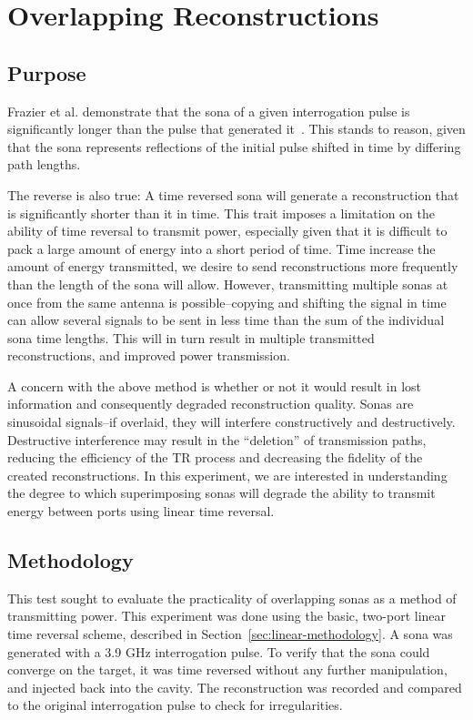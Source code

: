 \chapter{Overlapping Reconstructions}
\label{ch:overlapping}

\section{Purpose}
\label{sec:overlapping-purpose}

Frazier et al. demonstrate that the sona of a given interrogation pulse is significantly longer than the pulse that generated it~\cite{nltr-wave-chaotic}. This stands to reason, given that the sona represents reflections of the initial pulse shifted in time by differing path lengths.

The reverse is also true: A time reversed sona will generate a reconstruction that is significantly shorter than it in time. This trait imposes a limitation on the ability of time reversal to transmit power, especially given that it is difficult to pack a large amount of energy into a short period of time. Time increase the amount of energy transmitted, we desire to send reconstructions more frequently than the length of the sona will allow. However, transmitting multiple sonas at once from the same antenna is possible--copying and shifting the signal in time can allow several signals to be sent in less time than the sum of the individual sona time lengths. This will in turn result in multiple transmitted reconstructions, and improved power transmission.

A concern with the above method is whether or not it would result in lost information and consequently degraded reconstruction quality. Sonas are sinusoidal signals--if overlaid, they will interfere constructively and destructively. Destructive interference may result in the ``deletion'' of transmission paths, reducing the efficiency of the TR process and decreasing the fidelity of the created reconstructions. In this experiment, we are interested in understanding the degree to which superimposing sonas will degrade the ability to transmit energy between ports using linear time reversal.

\section{Methodology}
\label{sec:overlapping-meth}

This test sought to evaluate the practicality of overlapping sonas as a method of transmitting power. This experiment was done using the basic, two-port linear time reversal scheme, described in Section~\ref{sec:linear-methodology}. A sona was generated with a 3.9 GHz interrogation pulse. To verify that the sona could converge on the target, it was time reversed without any further manipulation, and injected back into the cavity. The reconstruction was recorded and compared to the original interrogation pulse to check for irregularities.

